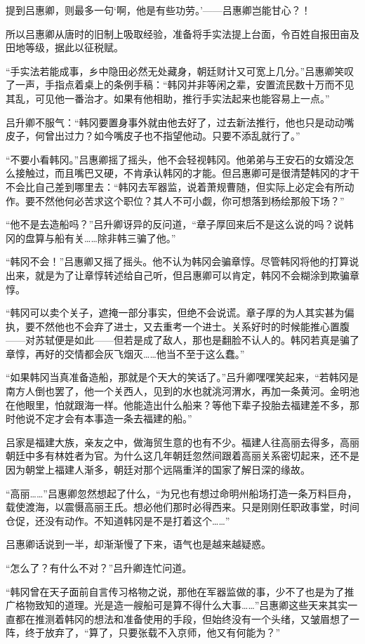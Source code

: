 提到吕惠卿，则最多一句‘啊，他是有些功劳。’——吕惠卿岂能甘心？！

所以吕惠卿从唐时的旧制上吸取经验，准备将手实法提上台面，令百姓自报田亩及田地等级，据此以征税赋。

“手实法若能成事，乡中隐田必然无处藏身，朝廷财计又可宽上几分。”吕惠卿笑叹了一声，手指点着桌上的条例手稿：“韩冈并非等闲之辈，安置流民数十万而不见其乱，可见他一番治才。如果有他相助，推行手实法起来也能容易上一点。”

吕升卿不服气：“韩冈要置身事外就由他去好了，过去新法推行，他也只是动动嘴皮子，何曾出过力？如今嘴皮子也不指望他动。只要不添乱就行了。”

“不要小看韩冈。”吕惠卿摇了摇头，他不会轻视韩冈。他弟弟与王安石的女婿没怎么接触过，而且嘴巴又硬，不肯承认韩冈的才能。但吕惠卿可是很清楚韩冈的才干不会比自己差到哪里去：“韩冈去军器监，说着萧规曹随，但实际上必定会有所动作。要不然他何必苦求这个职位？其人不可小觑，你可想落到杨绘那般下场？”

“他不是去造船吗？”吕升卿讶异的反问道，“章子厚回来后不是这么说的吗？说韩冈的盘算与船有关……除非韩三骗了他。”

“韩冈不会！”吕惠卿又摇了摇头。他不认为韩冈会骗章惇。尽管韩冈将他的打算说出来，就是为了让章惇转述给自己听，但吕惠卿可以肯定，韩冈不会糊涂到欺骗章惇。

“韩冈可以卖个关子，遮掩一部分事实，但绝不会说谎。章子厚的为人其实甚为偏执，要不然他也不会弃了进士，又去重考一个进士。关系好时的时候能推心置腹——对苏轼便是如此——但若是成了敌人，那也是翻脸不认人的。韩冈若真是骗了章惇，再好的交情都会灰飞烟灭……他当不至于这么蠢。”

“如果韩冈当真准备造船，那就是个天大的笑话了。”吕升卿嘿嘿笑起来，“若韩冈是南方人倒也罢了，他一个关西人，见到的水也就洮河渭水，再加一条黄河。金明池在他眼里，怕就跟海一样。他能造出什么船来？等他下辈子投胎去福建差不多，那时他说不定才会有本事造一条去福建的船。”

吕家是福建大族，亲友之中，做海贸生意的也有不少。福建人往高丽去得多，高丽朝廷中多有林姓者为官。为什么这几年朝廷忽然间跟着高丽关系密切起来，还不是因为朝堂上福建人渐多，朝廷对那个远隔重洋的国家了解日深的缘故。

“高丽……”吕惠卿忽然想起了什么，“为兄也有想过命明州船场打造一条万料巨舟，载使渡海，以震慑高丽王氏。想必他们那时必得西来。只是刚刚任职政事堂，时间仓促，还没有动作。不知道韩冈是不是打着这个……”

吕惠卿话说到一半，却渐渐慢了下来，语气也是越来越疑惑。

“怎么了？有什么不对？”吕升卿连忙问道。

“韩冈曾在天子面前自言传习格物之说，那他在军器监做的事，少不了也是为了推广格物致知的道理。光是造一艘船可是算不得什么大事……”吕惠卿这些天来其实一直都在推测着韩冈的想法和准备使用的手段，但始终没有一个头绪，又皱眉想了一阵，终于放弃了，“算了，只要张载不入京师，他又有何能为？”

